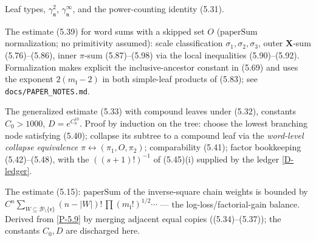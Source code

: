 \begin{definition}\label{D-leaf}
  \leanok
  Leaf types, \(\gamma^2_{\mathfrak n}\), \(\gamma^\infty_{\mathfrak n}\),
  and the power-counting identity (5.31).
\end{definition}

\begin{proposition}\label{P-5.10}
  \leanok
  The estimate (5.39) for word sums with a skipped set \(O\)
  (\(\mathrm{paperSum}\) normalization; no primitivity assumed): scale
  classification \(\sigma_1,\sigma_2,\sigma_3\), outer
  \(\boldsymbol{X}\)-sum (5.76)--(5.86), inner \(\pi\)-sum
  (5.87)--(5.98) via the local inequalities (5.90)--(5.92).
  Formalization makes explicit the inclusive-ancestor constant in (5.69)
  and uses the exponent
  \(2(m_{\mathfrak l}-2)\) in both simple-leaf products of (5.83);
  see \texttt{docs/PAPER\_NOTES.md}.
\end{proposition}

\begin{proposition}\label{P-5.9}
  \leanok
  The generalized estimate (5.33) with compound leaves under (5.32),
  constants \(C_0 > 1000\), \(D = e^{C_0^{10}}\). Proof by induction on
  the tree: choose the lowest branching node satisfying (5.40); collapse
  its subtree to a compound leaf via the \emph{word-level collapse
  equivalence} \(\pi \leftrightarrow (\pi_1, O, \pi_2)\); comparability
  (5.41); factor bookkeeping (5.42)--(5.48), with the
  \(((s+1)!)^{-1}\) of (5.45)(i) supplied by the ledger \ref{D-ledger}.
\end{proposition}

\begin{proposition}\label{P-5.7}
  \leanok
  The estimate (5.15): \(\mathrm{paperSum}\) of the inverse-square chain
  weights is bounded by
  \(C^n \sum_{W\subseteq\mathcal{B}\setminus\{\mathfrak r\}}
  (n - \lvert W\rvert)!\,\prod (m_{\mathfrak l}!)^{1/2}\cdots\)
  --- the log-loss/factorial-gain balance. Derived from \ref{P-5.9} by
  merging adjacent equal copies ((5.34)--(5.37)); the constants
  \(C_0, D\) are discharged here.
\end{proposition}

